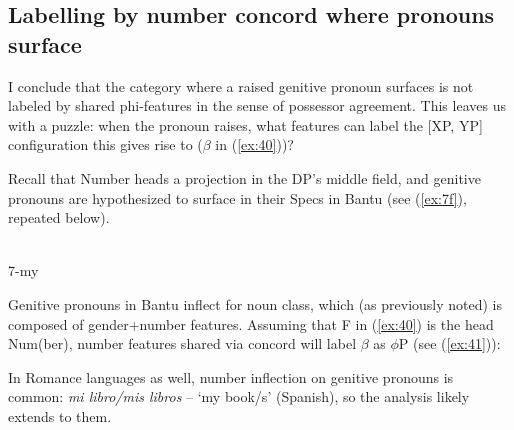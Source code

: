 \documentclass[output=paper
,modfonts
,nonflat]{langsci/langscibook}
\begin{document}
\subsection{Labelling by number concord where pronouns surface} \label{sec:5.3}
I conclude that the category where a raised genitive pronoun surfaces is not labeled by shared phi-features in the sense of possessor agreement. This leaves us with a puzzle: when the pronoun raises, what features can label the [XP, YP] configuration this gives rise to ($\beta$ in (\ref{ex:40}))? 

\begin{figure}[!h]
\begin{exe}
\end{exe}
\end{figure}
\noindent Recall that Number heads a projection in the DP’s middle field, and genitive pronouns are hypothesized to surface in their Specs in Bantu (see (\ref{ex:7f}), repeated below).

\begin{exe}
	\gll {}\\
	\mbox{\hspace{3.5cm}7-my}  \\
\end{exe}
Genitive pronouns in Bantu inflect for noun class, which (as previously noted) is composed of gender+number features. Assuming that F in (\ref{ex:40}) is the head Num(ber), number features shared via concord will label $\beta$ as $\phi$P (see (\ref{ex:41})):

\begin{figure}[!h]
	\begin{exe}
	\end{exe}
\end{figure}
\newpage\noindent In Romance languages as well, number inflection on genitive pronouns is common: \textit{mi libro/mis libros} – ‘my book/s’ (Spanish), so the analysis likely extends to them.
\end{document}
